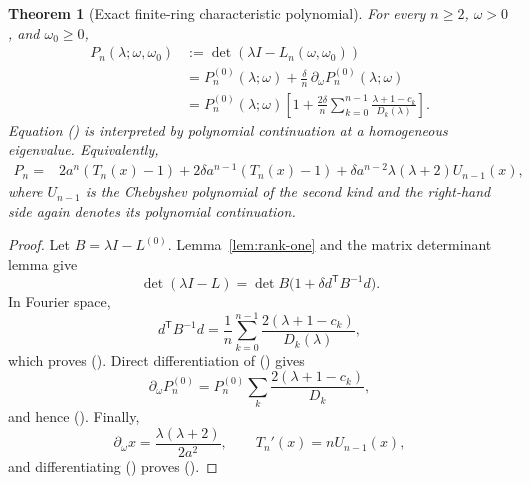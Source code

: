 \documentclass[twoside,10pt]{article}
\numberwithin{equation}{section}
\theoremstyle{slbody}
\newtheorem{theorem}{Theorem}[section]
\theoremstyle{definition}
\theoremstyle{remark}
\renewcommand{\eqref}[1]{%
  \textup{{\normalfont(\oldstylenums{\ref{#1}}}\normalfont)}}
\begin{document}
\begin{theorem}[Exact finite-ring characteristic polynomial]\label{thm:characteristic}
For every $n\geq2$, $\omega>0$, and $\omega_0\geq0$,
\begin{align}
 P_n(\lambda;\omega,\omega_0)
  &:=\det(\lambda I-L_n(\omega,\omega_0))\label{eq:P-def}\\
  &=P_n^{(0)}(\lambda;\omega)
    +\frac{\delta}{n}\,\partial_\omega
       P_n^{(0)}(\lambda;\omega)\label{eq:derivative-form}\\
  &=P_n^{(0)}(\lambda;\omega)
    \left[1+\frac{2\delta}{n}
      \sum_{k=0}^{n-1}\frac{\lambda+1-c_k}{D_k(\lambda)}\right].
      \label{eq:resolvent-form}
\end{align}
Equation \eqref{eq:resolvent-form} is interpreted by polynomial
continuation at a homogeneous eigenvalue.  Equivalently,
\begin{align}
 P_n={}&2a^n(T_n(x)-1)
      +2\delta a^{n-1}(T_n(x)-1)
      +\delta a^{n-2}\lambda(\lambda+2)U_{n-1}(x),
      \label{eq:cheb-defect}
\end{align}
where $U_{n-1}$ is the Chebyshev polynomial of the second kind and the
right-hand side again denotes its polynomial continuation.
\end{theorem}

\begin{proof}
Let $B=\lambda I-L^{(0)}$.  Lemma~\ref{lem:rank-one} and the matrix
determinant lemma give
\[
 \det(\lambda I-L)=\det B\bigl(1+\delta d^{\mathsf T}B^{-1}d\bigr).
\]
In Fourier space,
\[
 d^{\mathsf T}B^{-1}d
   =\frac1n\sum_{k=0}^{n-1}
      \frac{2(\lambda+1-c_k)}{D_k(\lambda)},
\]
which proves \eqref{eq:resolvent-form}.  Direct differentiation of
\eqref{eq:P0-product} gives
\[
 \partial_\omega P_n^{(0)}
 =P_n^{(0)}\sum_k\frac{2(\lambda+1-c_k)}{D_k},
\]
and hence \eqref{eq:derivative-form}.  Finally,
\[
 \partial_\omega x=\frac{\lambda(\lambda+2)}{2a^2},
 \qquad T_n'(x)=nU_{n-1}(x),
\]
and differentiating \eqref{eq:P0-cheb} proves
\eqref{eq:cheb-defect}.
\end{proof}
\end{document}
